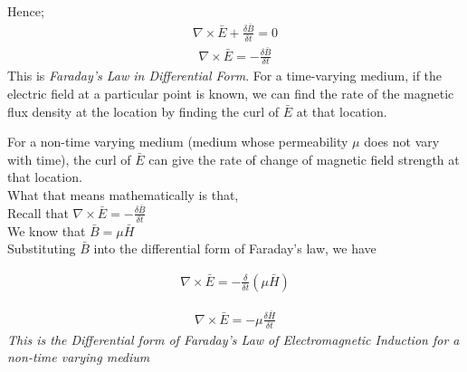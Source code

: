 Hence;
\begin{align*}
	\nabla \times \bar{E}+ \frac{\delta \bar{B}}{\delta t} = 0
\end{align*}
\begin{align}
	\nabla \times \bar{E} = -\frac{\delta \bar{B}}{\delta t}
\end{align}
This is \emph{Faraday's Law in Differential Form}. For a time-varying medium, if the electric field at a particular point is known, we can find the rate of the magnetic flux density at the location by finding the curl of $\bar{E}$ at that location.

For a non-time varying medium (medium whose permeability $\mu$ does not vary with time), the curl of $\bar{E}$ can give the rate of change of magnetic field strength at that location.\\

What that means mathematically is that,\\


Recall that $\nabla \times \bar{E} = - \frac{\delta\bar{B}}{\delta t}$\\


We know that $\bar{B} = \mu \bar{H}$ $\quad$\\

Substituting $\bar{B}$ into the differential form of Faraday's law, we have	


\begin{align*}
	\nabla \times \bar{E} = - \frac{\delta}{\delta t} (\mu\bar{H})
\end{align*}

\begin{align}
	\nabla \times \bar{E} = -\mu\frac{\delta \bar{H}}{\delta t}
\end{align}
\emph{This is the Differential form of Faraday's Law of Electromagnetic Induction for a non-time varying medium}

